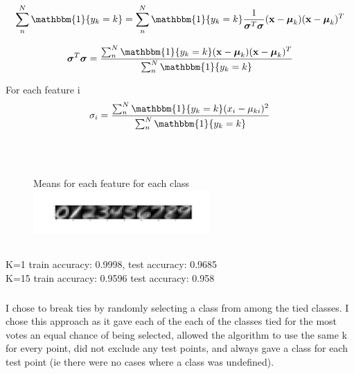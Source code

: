 \documentclass[12pt,letterpaper]{article} %
\newcommand{\bs}[1]{\bm{\mathrm{#1}}} %
\newcommand{\switch}[0]{\mathbbm{1}\{y_k=k\}}
\begin{document}
  \begin{equation*}
\sum^N_n\switch  = \sum^N_n\switch\frac{1}{\bs{\sigma}^T\bs{\sigma}}(\bs{x}-\bs{\mu}_k)(\bs{x}-\bs{\mu}_k)^T
 \end{equation*}
 
   \begin{equation*}
\bs{\sigma}^T\bs{\sigma} = \frac{\sum^N_n\switch(\bs{x}-\bs{\mu}_k)(\bs{x}-\bs{\mu}_k)^T}{\sum^N_n\switch}
 \end{equation*}
 
 For each feature i
 \begin{equation*}
\sigma_i = \frac{\sum^N_n\switch(x_i-\mu_{ki})^2}{\sum^N_n\switch}
 \end{equation*}
 \
 \section{}
 
  \subsubsection{}
  \begin{figure}[!h]
  \centering
  \caption{}{ Means for each feature for each class}
   \includegraphics[width=0.6\textwidth, trim={3in 0in 0in 0in},clip=true ]{q0_means.png}
\end{figure}
\FloatBarrier

\subsection{}
 \subsubsection{}
 K=1 train accuracy: 0.9998, test accuracy: 0.9685 \\
 K=15 train accuracy: 0.9596 test accuracy: 0.958\\
 
 \subsubsection {}
 
 I chose to break ties by randomly selecting a class from among the tied classes. I chose this approach as it gave each of the each of the classes tied for the most votes an equal chance of being selected, allowed the algorithm to use the same k for every point, did not exclude any test points, and always gave a class for each test point (ie there were no cases where a class was undefined). 
 
\end{document}

